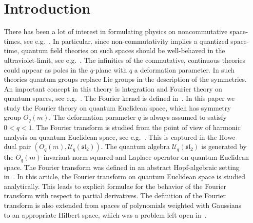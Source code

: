 \documentclass[pdftex]{sigma}
\newcommand{\cU}{\mathcal{U}}
\numberwithin{equation}{section}
\begin{document}
\section{Introduction}
There has been a lot of interest in formulating physics on noncommutative space-times, see e.g.~\cite{MR1243712, MR1097174, MR1239953, MR1328733, MR1303081, MR1317458}. In particular, since non-commutativity implies a quantized space-time, quantum f\/ield theories on such spaces should be well-behaved in the ultraviolet-limit, see e.g.~\cite{MR1243712}. The inf\/inities of the commutative, continuous theories could appear as poles in the $q$-plane with $q$ a deformation parameter. In such theories quantum groups replace Lie groups in the description of the symmetries. An important concept in this theory is integration and Fourier theory on quantum spaces, see e.g.~\cite{MR1722348, MR1303081, MR1317458, MR1408120, MR2035025, MR2099760}. The Fourier kernel is def\/ined in~\cite[Def\/inition~4.1]{MR1235979}. In this paper we study the Fourier theory on quantum Euclidean space, which has symmetry group $O_q(m)$. The deformation parameter $q$ is always assumed to satisfy $0<q<1$. The Fourier transform is studied from the point of view of harmonic analysis on quantum Euclidean space, see e.g.~\cite{MR1097174, MR1328733, MR2006509, MR1182031, MR1361741}. This is captured in the Howe dual pair $(O_q(m),\cU_q(\mathfrak{sl}_2))$. The quantum algebra $\cU_q(\mathfrak{sl}_2)$ is generated by the $O_q(m)$-invariant norm squared and Laplace operator on quantum Euclidean space. The Fourier transform was def\/ined in an abstract Hopf-algebraic setting in~\cite{MR1303081}. In this article, the Fourier transform on quantum Euclidean space is studied analytically. This leads to explicit formulae for the behavior of the Fourier transform with respect to partial derivatives. The def\/inition of the Fourier transform is also extended from spaces of polynomials weighted with Gaussians to an appropriate Hilbert space, which was a problem left open in~\cite{MR1303081}.
\end{document}

